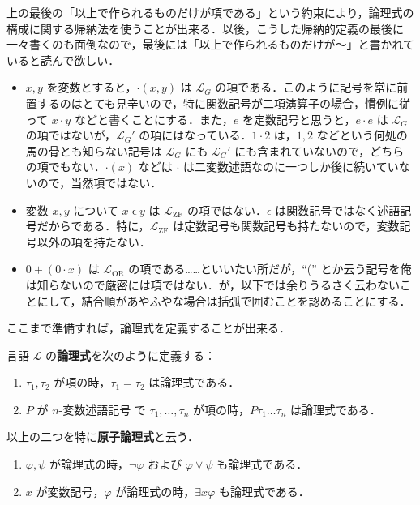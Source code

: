 \documentclass[a4j]{jsarticle}
\begin{document}
上の最後の「以上で作られるものだけが項である」という約束により，論理式の構成に関する帰納法を使うことが出来る．以後，こうした帰納的定義の最後に一々書くのも面倒なので，最後には「以上で作られるものだけが〜」と書かれていると読んで欲しい．

\begin{example}
 \begin{itemize}
  \item $x, y$ を変数とすると，$\mathord{\cdot}(x, y)$ は $\mathcal{L}_G$ の項である．このように記号を常に前置するのはとても見辛いので，特に関数記号が二項演算子の場合，慣例に従って $x \cdot y$ などと書くことにする．また，$e$ を定数記号と思うと，$e \cdot e$ は $\mathcal{L}_G$ の項ではないが，$\mathcal{L}_G'$ の項にはなっている．$1 \cdot 2$ は，$1, 2$ などという何処の馬の骨とも知らない記号は $\mathcal{L}_G$ にも $\mathcal{L}_G'$ にも含まれていないので，どちらの項でもない．$\cdot(x)$ などは $\cdot$ は二変数述語なのに一つしか後に続いていないので，当然項ではない．
  \item 変数 $x, y$ について $x \mathrel{\epsilon} y$ は $\mathcal{L}_{\mathrm{ZF}}$ の項ではない．$\epsilon$ は関数記号ではなく述語記号だからである．特に，$\mathcal{L}_{\mathrm{ZF}}$ は定数記号も関数記号も持たないので，変数記号以外の項を持たない．
  \item $0 + (0 \cdot x)$ は $\mathcal{L}_{\mathrm{OR}}$ の項である……といいたい所だが，``('' とか云う記号を俺は知らないので厳密には項ではない．が，以下では余りうるさく云わないことにして，結合順があやふやな場合は括弧で囲むことを認めることにする．
 \end{itemize}
\end{example}

ここまで準備すれば，論理式を定義することが出来る．

\begin{definition}[論理式]
 言語 $\mathcal{L}$ の{\bfseries 論理式}を次のように定義する：
 \begin{enumerate}
  \item $\tau_1, \tau_2$ が項の時，$\tau_1 = \tau_2$ は論理式である．
  \item $P$ が $n$-変数述語記号 で $\tau_1, \dots, \tau_n$ が項の時，$P \tau_1 \dots \tau_n$ は論理式である．
 \end{enumerate} 
 以上の二つを特に{\bfseries 原子論理式}と云う．
 \begin{enumerate}[start=3]
  \item $\varphi, \psi$ が論理式の時，$\neg \varphi$ および $\varphi \vee \psi$ も論理式である．
  \item $x$ が変数記号，$\varphi$ が論理式の時，$\exists x \varphi$ も論理式である．
 \end{enumerate}
\end{definition}
\end{document}
